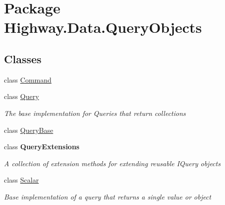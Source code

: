 \hypertarget{namespace_highway_1_1_data_1_1_query_objects}{\section{Package Highway.\-Data.\-Query\-Objects}
\label{namespace_highway_1_1_data_1_1_query_objects}
}
\subsection*{Classes}
\begin{DoxyCompactItemize}
\item 
class \hyperlink{class_highway_1_1_data_1_1_query_objects_1_1_command}{Command}
\begin{DoxyCompactList}\small\item\em \end{DoxyCompactList}\item 
class \hyperlink{class_highway_1_1_data_1_1_query_objects_1_1_query-g}{Query}
\begin{DoxyCompactList}\small\item\em The base implementation for Queries that return collections \end{DoxyCompactList}\item 
class \hyperlink{class_highway_1_1_data_1_1_query_objects_1_1_query_base}{Query\-Base}
\item 
class {\bfseries Query\-Extensions}
\begin{DoxyCompactList}\small\item\em A collection of extension methods for extending reusable I\-Query objects \end{DoxyCompactList}\item 
class \hyperlink{class_highway_1_1_data_1_1_query_objects_1_1_scalar-g}{Scalar}
\begin{DoxyCompactList}\small\item\em Base implementation of a query that returns a single value or object \end{DoxyCompactList}\end{DoxyCompactItemize}
